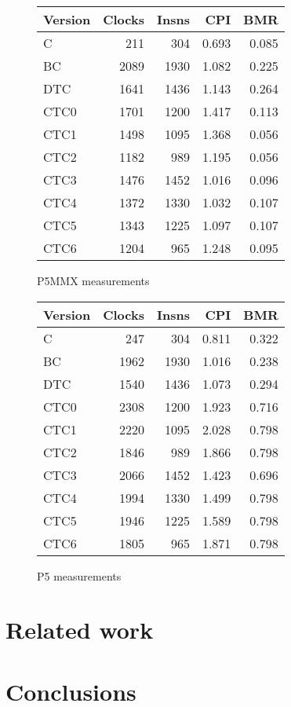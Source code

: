 \documentclass[10pt,a4paper]{article}
\begin{document}
\begin{figure}[htb]
\begin{center}
\begin{tabular}{|@{~}l|r|r|r|r|}
\hline
Version & Clocks & Insns & CPI & BMR \\
\hline
C    &  211 &  304 & 0.693 & 0.085 \\
BC   & 2089 & 1930 & 1.082 & 0.225 \\
DTC  & 1641 & 1436 & 1.143 & 0.264 \\
CTC0 & 1701 & 1200 & 1.417 & 0.113 \\
CTC1 & 1498 & 1095 & 1.368 & 0.056 \\
CTC2 & 1182 &  989 & 1.195 & 0.056 \\
CTC3 & 1476 & 1452 & 1.016 & 0.096 \\
CTC4 & 1372 & 1330 & 1.032 & 0.107 \\
CTC5 & 1343 & 1225 & 1.097 & 0.107 \\
CTC6 & 1204 &  965 & 1.248 & 0.095 \\
\hline
\end{tabular}
\end{center}
\caption{P5MMX measurements}
\label{fig:measurements-p5mmx}
\end{figure}

\begin{figure}[htb]
\begin{center}
\begin{tabular}{|@{~}l|r|r|r|r|}
\hline
Version & Clocks & Insns & CPI & BMR \\
\hline
C    &  247 &  304 & 0.811 & 0.322 \\
BC   & 1962 & 1930 & 1.016 & 0.238 \\
DTC  & 1540 & 1436 & 1.073 & 0.294 \\
CTC0 & 2308 & 1200 & 1.923 & 0.716 \\
CTC1 & 2220 & 1095 & 2.028 & 0.798 \\
CTC2 & 1846 &  989 & 1.866 & 0.798 \\
CTC3 & 2066 & 1452 & 1.423 & 0.696 \\
CTC4 & 1994 & 1330 & 1.499 & 0.798 \\
CTC5 & 1946 & 1225 & 1.589 & 0.798 \\
CTC6 & 1805 &  965 & 1.871 & 0.798 \\
\hline
\end{tabular}
\end{center}
\caption{P5 measurements}
\label{fig:measurements-p5}
\end{figure}

%
\section{Related work}
\cite{Bell73,Dewar75,Ritter80,Klint81,Kogge82,ErtlG01,ErtlG03:PLDI,ErtlG03:JILP,HoogerbruggeATW99,HoogerbruggeA00,DavisBCGW03,Proebsting95:POPL,BhandarkarD97,Costa99:ppdp,NassenCS01,PiumartaR98,IA32OPT,Rodriguez93:tcj59,Curley93,ShiGBE05,BerndlVZB05,RossiS96,VitaleA05,ErtlG04,SullivanBBGA03}
%
\section{Conclusions}
%


%
\end{document}
